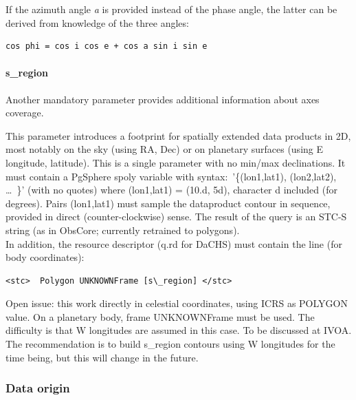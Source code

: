 \documentclass[11pt,a4paper]{ivoa}
\begin{document}
If the azimuth angle \emph{a} is provided instead of the phase angle, the latter can be derived from knowledge of the three angles:






\begin{verbatim}cos phi = cos i cos e + cos a sin i sin e\end{verbatim}




\paragraph{s\_region}

Another mandatory parameter provides additional information about axes coverage.

This parameter introduces a footprint for spatially extended data products in 2D, most notably on the sky (using RA, Dec) or on planetary surfaces (using E longitude, latitude). This is a single parameter with no min/max declinations. It must contain a PgSphere spoly variable with syntax: '\{(lon1,lat1), (lon2,lat2), … \}' (with no quotes) where (lon1,lat1) = (10.d, 5d), character d included (for degrees). Pairs (lon1,lat1) must sample the dataproduct contour in sequence, provided in direct (counter-clockwise) sense. The result of the query is an STC-S string (as in ObsCore; currently retrained to polygons).\\

In addition, the resource descriptor (q.rd for DaCHS) must contain the line (for body coordinates):






\begin{verbatim}<stc>  Polygon UNKNOWNFrame [s\_region] </stc>\end{verbatim}




Open issue: this work directly in celestial coordinates, using ICRS as POLYGON value. On a planetary body, frame UNKNOWNFrame must be used. The difficulty is that W longitudes are assumed in this case. To be discussed at IVOA. The recommendation is to build s\_region contours using W longitudes for the time being, but this will change in the future.

\subsubsection{Data origin}
\end{document}

